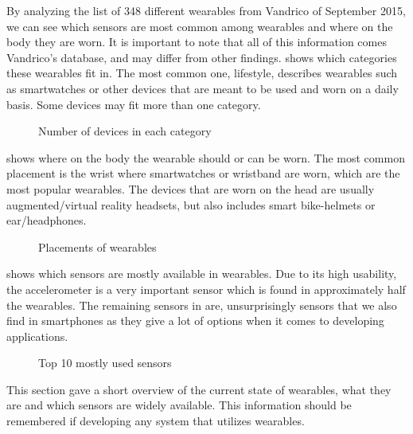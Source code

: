 By analyzing the list of 348 different wearables from Vandrico\cite{LISTOFWEARABLES} of September 2015, we can see which sensors are most common among wearables and where on the body they are worn. It is important to note that all of this information comes Vandrico's database, and may differ from other findings.  shows which categories these wearables fit in. The most common one, lifestyle, describes wearables such as smartwatches or other devices that are meant to be used and worn on a daily basis. Some devices may fit more than one category.

\begin{figure}[!htb]
    \centering
    
    \caption{Number of devices in each category}
    \label{fig:wearables-category}
\end{figure}

 shows where on the body the wearable should or can be worn. The most common placement is the wrist where smartwatches or wristband are worn, which are the most popular wearables. The devices that are worn on the head are usually augmented/virtual reality headsets, but also includes smart bike-helmets or ear/headphones.

\begin{figure}[!htb]
  \centering
  
  \caption{Placements of wearables}
  \label{fig:wearables-placement}
\end{figure}

 shows which sensors are mostly available in wearables. Due to its high usability, the accelerometer is a very important sensor which is found in approximately half the wearables. The remaining sensors in  are, unsurprisingly sensors that we also find in smartphones as they give a lot of options when it comes to developing applications. 
\begin{figure}[!htb]
    \centering
    
    \caption{Top 10 mostly used sensors}
    \label{fig:wearables-sensors}
\end{figure}

This section gave a short overview of the current state of wearables, what they are and which sensors are widely available. This information should be remembered if developing any system that utilizes wearables. 

